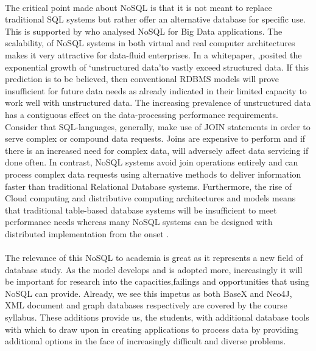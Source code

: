 \documentclass[12pt]{article}
\begin{document}
\paragraph{}
The critical point made about NoSQL is that it is not meant to replace traditional SQL systems but rather offer an alternative database for specific use. This is supported by \cite{hossain13} who analysed NoSQL for Big Data applications. The scalability, \cite{mcCreary14} of NoSQL systems in both virtual and real computer architectures makes it very attractive for data-fluid enterprises. In a whitepaper, \citep{couch16},posited the exponential growth of \lq unstructured data\rq to vastly exceed structured data. If this prediction is to be believed, then conventional RDBMS models will prove insufficient for future data needs as already indicated in their limited capacity to work well with unstructured data. The increasing prevalence of unstructured data has a contiguous effect on the data-processing performance requirements. Consider that SQL-languages, generally, make use of JOIN statements in order to serve complex or compound data requests. Joins are expensive to perform and if there is an increased need for complex data, will adversely affect data servicing if done often. In contrast, NoSQL systems avoid join operations entirely and can process complex data requests using alternative methods to deliver information faster than traditional Relational Database systems. Furthermore, the rise of Cloud computing and distributive computing architectures and models means that traditional table-based database systems will be insufficient to meet performance needs whereas many NoSQL systems can be designed with distributed implementation from the onset \cite{couch16}. 
\paragraph{}
The relevance of this NoSQL to academia is great as it represents a new field of database study. As the model develops and is adopted more, increasingly it will be important for research into the capacities,failings and opportunities that using NoSQL can provide. Already, we see this impetus as both BaseX and Neo4J, XML document and graph databases respectively are covered by the course syllabus. These additions provide us, the students, with additional database tools with which to draw upon in creating applications to process data by providing additional options in the face of increasingly difficult and diverse problems.
\end{document}
